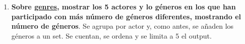 \documentclass[a4paper,onecolumn]{article}
\begin{document}
\begin{sloppypar}
\begin{enumerate}
\begin{figure}[H]
\begin{subfigure}[b]{0.4\textwidth}
        \end{subfigure}
   \end{figure}
   \newpage
    \item \textbf{Sobre \underline{genres}, mostrar los 5 actores y lo géneros en los que han participado con más número de géneros diferentes, mostrando el número de géneros}.
    Se agrupa por actor y, como antes, se añaden los géneros a un set. Se cuentan, se ordena y se limita a 5 el output.

\end{enumerate}
\end{sloppypar}
\end{document}
